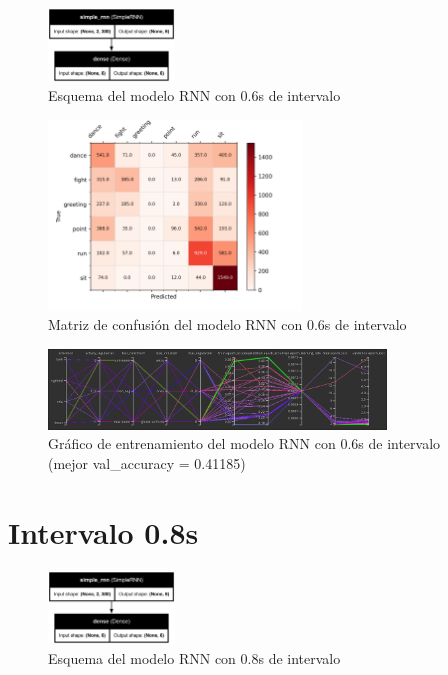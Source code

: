 \begin{figure}[H]
    \centering
    \includegraphics[width=0.3\textwidth]{Imagenes/Bitmap/best-rnn0.6.png}
    \caption{Esquema del modelo RNN con 0.6s de intervalo}
    \label{fig:rnn-0.6-final}
\end{figure}

\begin{figure}[H]
    \centering
    \includegraphics[width=0.6\textwidth]{Imagenes/Bitmap/CM_best-rnn0.6.png}
    \caption{Matriz de confusión del modelo RNN con 0.6s de intervalo}
    \label{fig:rnn-0.6-matriz}
\end{figure}

\begin{figure}[H]
    \centering
    \includegraphics[width=0.8\textwidth]{Imagenes/Bitmap/tb-rnn-0.6.png}
    \caption{Gráfico de entrenamiento del modelo RNN con 0.6s de intervalo (mejor val\_accuracy = 0.41185)}
    \label{fig:rnn-0.6-grafico}
\end{figure}

\section{Intervalo 0.8s}

\begin{figure}[H]
    \centering
    \includegraphics[width=0.3\textwidth]{Imagenes/Bitmap/best-rnn0.8.png}
    \caption{Esquema del modelo RNN con 0.8s de intervalo}
    \label{fig:rnn-0.8-final}
\end{figure}

